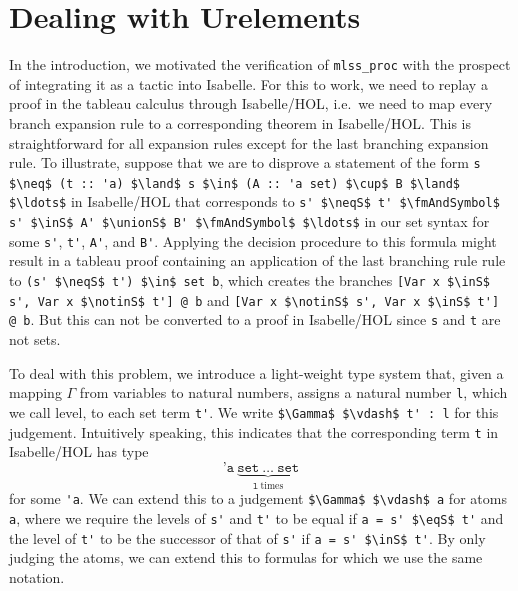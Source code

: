 \documentclass[runningheads]{llncs}
\newcommand{\unionS}{\sqcup_\text{s}}
\newcommand{\inS}{\in_\text{s}}
\newcommand{\notinS}{\notin_\text{s}}
\newcommand{\eqS}{=_\text{s}}
\newcommand{\neqS}{\neq_\text{s}}
\newcommand{\fmAndSymbol}{\boldsymbol{\land}}
\begin{document}
\section{Dealing with Urelements}
In the introduction, we motivated the verification of \lstinline!mlss_proc! with the prospect of integrating it as a tactic into Isabelle.
For this to work, we need to replay a proof in the tableau calculus through Isabelle/HOL, i.e.\ we need to map every branch expansion rule to a corresponding theorem in Isabelle/HOL.
This is straightforward for all expansion rules except for the last branching expansion rule.
To illustrate, suppose that we are to disprove a statement of the form \lstinline!s $\neq$ (t :: 'a) $\land$ s $\in$ (A :: 'a set) $\cup$ B $\land$ $\ldots$! in Isabelle/HOL
that corresponds to \lstinline!s' $\neqS$ t' $\fmAndSymbol$ s' $\inS$ A' $\unionS$ B' $\fmAndSymbol$ $\ldots$! in our set syntax for some \lstinline!s'!, \lstinline!t'!, \lstinline!A'!, and \lstinline!B'!.
Applying the decision procedure to this formula might result in a tableau proof containing an application of the last branching rule rule to \lstinline!(s' $\neqS$ t') $\in$ set b!, which creates the branches \lstinline![Var x $\inS$ s', Var x $\notinS$ t'] @ b! and \lstinline![Var x $\notinS$ s', Var x $\inS$ t'] @ b!.
But this can not be converted to a proof in Isabelle/HOL since \lstinline!s! and \lstinline!t! are not sets.

To deal with this problem, we introduce a light-weight type system that, given a mapping $\Gamma$ from variables to natural numbers, assigns a natural number \lstinline!l!, which we call level, to each set term \lstinline!t'!. 
We write \lstinline!$\Gamma$ $\vdash$ t' : l! for this judgement.
Intuitively speaking, this indicates that the corresponding term \lstinline!t! in Isabelle/HOL has type
\[
  \texttt{'a}\ \underbrace{\texttt{set}\ \ldots\ \texttt{set}}_{\texttt{l}\ \text{times}}
\]
for some \lstinline!'a!.
We can extend this to a judgement \lstinline!$\Gamma$ $\vdash$ a! for atoms \lstinline!a!, where we require the levels of \lstinline!s'! and \lstinline!t'! to be equal if \lstinline!a = s' $\eqS$ t'! and the level of \lstinline!t'! to be the successor of that of \lstinline!s'! if \lstinline!a = s' $\inS$ t'!.
By only judging the atoms, we can extend this to formulas for which we use the same notation.
\end{document}
